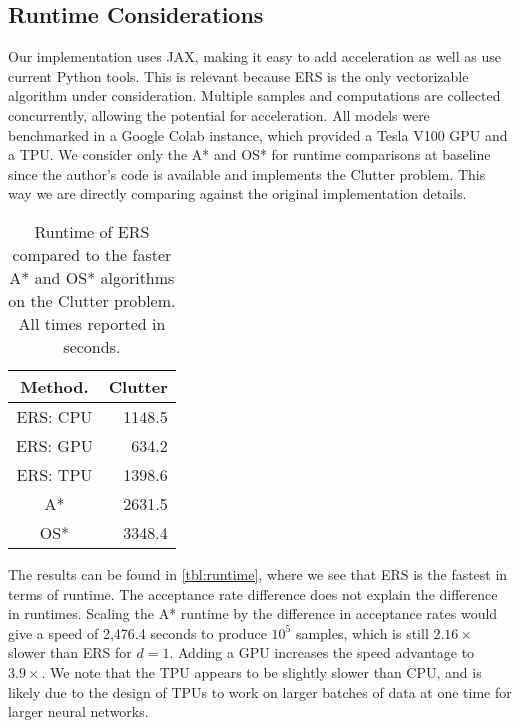 \documentclass{ecai}  %
\begin{document}
\subsection{Runtime Considerations}

Our implementation uses JAX, making it easy to add acceleration as well as use current Python tools. This is relevant because ERS is the only vectorizable algorithm under consideration. Multiple samples and computations are collected concurrently, allowing the potential for acceleration. All models were benchmarked in a Google Colab instance, which provided a Tesla V100 GPU and a TPU. We consider only the A* and OS* for runtime comparisons at baseline since the author's code is available and implements the Clutter problem. This way we are directly comparing against the original implementation details.  

%
\begin{wraptable}[16]{r}{0.35\columnwidth}
\vspace{-10pt}
\centering
\caption{Runtime of ERS compared to the faster A* and OS* algorithms on the Clutter problem. All times reported in seconds. } \label{tbl:runtime}
\begin{tabular}{@{}cr@{}}
\toprule
Method.                      & Clutter                       \\ \midrule
ERS: CPU                     & 1148.5                                    \\
ERS: GPU                     & 634.2                                      \\
ERS: TPU                     & 1398.6                                    \\
A*                           & 2631.5                                          \\
OS*                          & 3348.4                                           \\ \bottomrule
\end{tabular}
\end{wraptable}

The results can be found in \autoref{tbl:runtime}, where we see that ERS is the fastest in terms of runtime. The acceptance rate difference does not explain the difference in runtimes. Scaling the A* runtime by the difference in acceptance rates would give a speed of 2,476.4 seconds to produce $10^5$ samples, which is still $2.16\times$ slower than ERS for $d=1$. Adding a GPU increases the speed advantage to $3.9\times$. We note that the TPU appears to be slightly slower than CPU, and is likely due to the design of TPUs to work on larger batches of data at one time for larger neural networks. 
\end{document}
